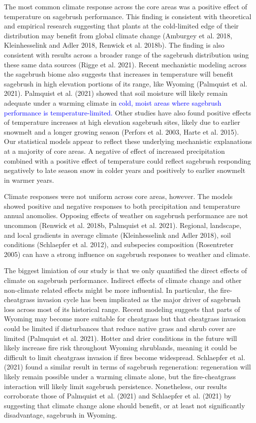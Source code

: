 \documentclass[
  12pt,
]{article}
\begin{document}
The most common climate response across the core areas was a positive effect of temperature on sagebrush performance.
This finding is consistent with theoretical and empirical research suggesting that plants at the cold-limited edge of their distribution may benefit from global climate change (Amburgey et al. 2018, Kleinhesselink and Adler 2018, Renwick et al. 2018b).
The finding is also consistent with results across a broader range of the sagebrush distribution using these same data sources (Rigge et al. 2021).
Recent mechanistic modeling across the sagebrush biome also suggests that increases in temperature will benefit sagebrush in high elevation portions of its range, like Wyoming (Palmquist et al. 2021).
Palmquist et al. (2021) showed that soil moisture will likely remain adequate under a warming climate in \textcolor{blue}{cold, moist areas where sagebrush performance is temperature-limited.}
Other studies have also found positive effects of temperature increases at high elevation sagebrush sites, likely due to earlier snowmelt and a longer growing season (Perfors et al. 2003, Harte et al. 2015).
Our statistical models appear to reflect these underlying mechanistic explanations at a majority of core areas.
A negative of effect of increased precipitation combined with a positive effect of temperature could reflect sagebrush responding negatively to late season snow in colder years and positively to earlier snowmelt in warmer years.

Climate responses were not uniform across core areas, however.
The models showed positive and negative responses to both precipitation and temperature annual anomolies.
Opposing effects of weather on sagebrush performance are not uncommon (Renwick et al. 2018b, Palmquist et al. 2021).
Regional, landscape, and local gradients in average climate (Kleinhesselink and Adler 2018), soil conditions (Schlaepfer et al. 2012), and subspecies composition (Rosentreter 2005) can have a strong influence on sagebrush responses to weather and climate.

The biggest limiation of our study is that we only quantified the direct effects of climate on sagebrush performance.
Indirect effects of climate change and other non-climate related effects might be more influential.
In particular, the fire-cheatgrass invasion cycle has been implicated as the major driver of sagebrush loss across most of its historical range.
Recent modeling suggests that parts of Wyoming may become more suitable for cheatgrass but that cheatgrass invasion could be limited if disturbances that reduce native grass and shrub cover are limited (Palmquist et al. 2021).
Hotter and drier conditions in the future will likely increase fire risk throughout Wyoming shrublands, meaning it could be difficult to limit cheatgrass invasion if fires become widespread.
Schlaepfer et al. (2021) found a similar result in terms of sagebrush regeneration: regeneration will likely remain possible under a warming climate alone, but the fire-cheatgrass interaction will likely limit sagebrush persistence.
Nonetheless, our results corroborate those of Palmquist et al. (2021) and Schlaepfer et al. (2021) by suggesting that climate change alone should benefit, or at least not significantly disadvantage, sagebrush in Wyoming.
\end{document}
